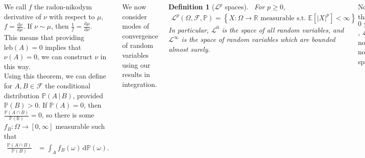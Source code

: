\documentclass{tikzposter} %
\newtheorem{definition}{Definition}
\begin{document}
\begin{columns}
{{      We call $f$ the radon-nikodym derivative of $\nu$ with respect to $\mu$, $\displaystyle f = \frac{\mathrm{d}\nu}{\mathrm{d}\mu}$. If $\nu \sim \mu$, then $\displaystyle \frac{1}{f} = \frac{\mathrm{d}\mu}{\mathrm{d}\nu}$. \\

      This means that providing $\mathrm{leb}(A) = 0$ implies that $\nu(A) = 0$, we can construct $\nu$ in this way. \\

      Using this theorem, we can define for $A, B \in \mathcal{F}$ the conditional distribution $\mathbb{P}(A \,|\, B)$, provided $\mathbb{P}(B) > 0$. If $\mathbb{P}(A) = 0$, then $\displaystyle \frac{\mathbb{P}(A \cap B)}{\mathbb{P(B)}} = 0$, so there is some $f_{B} : \Omega \to [0,\infty]$ measurable such that
      \begin{align*}
        \frac{\mathbb{P}(A \cap B)}{\mathbb{P}(B)} &= \int_{A} f_{B}(\omega) \, \mathrm{d}\mathbb{P}(\omega).
      \end{align*}
    }
    \hphantom{}

    We now consider modes of convergence of random variables using our results in integration. \\

    \begin{definition}[$\mathcal{L}^{p}$ spaces]
      \ For $p \ge 0$,
      \begin{align*}
        \mathcal{L}^{p}(\Omega, \mathcal{F}, \mathbb{P}) = \left\{X : \Omega \to \mathbb{R} \text{ measurable s.t. } \mathbb{E}\left[|X|^{p}\right] < \infty\right\}
      \end{align*}
      In particular, $\mathcal{L}^{0}$ is the space of all random variables, and $\mathcal{L}^{\infty}$ is the space of random variables which are bounded almost surely.
    \end{definition}
    \hphantom{}

    Note that for $0 \le p < 1$, $\mathcal{L}^{p}$ is not a normed space.

}
\end{columns}
\end{document}
